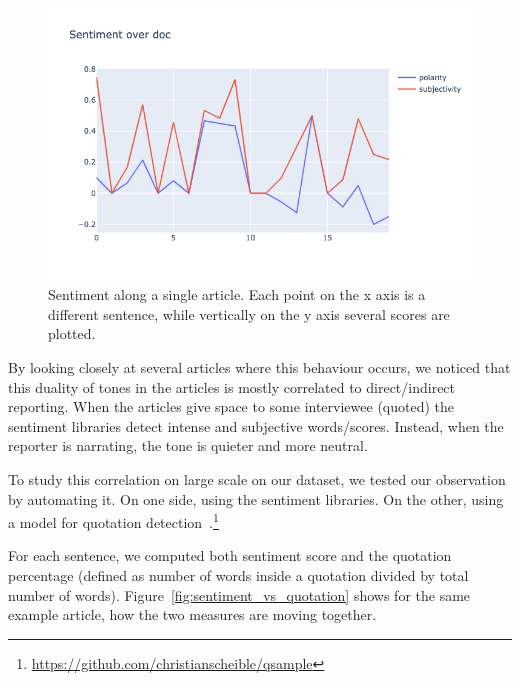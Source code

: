 \begin{figure}[!htbp]
    \centering
    \includegraphics[width=\linewidth]{figures/sentiment_across_article.png}
    \caption{Sentiment along a single article. Each point on the x axis is a different sentence, while vertically on the y axis several scores are plotted.}
    \label{fig:sentiment_across_one_article}
\end{figure}

By looking closely at several articles where this behaviour occurs, we noticed that this duality of tones in the articles is mostly correlated to direct/indirect reporting. When the articles give space to some interviewee (quoted) the sentiment libraries detect intense and subjective words/scores. Instead, when the reporter is narrating, the tone is quieter and more neutral.

To study this correlation on large scale on our dataset, we tested our observation by automating it.
On one side, using the sentiment libraries. On the other, using a model for quotation detection~\citep{scheible2016model}.\footnote{\url{https://github.com/christianscheible/qsample}}

For each sentence, we computed both sentiment score and the quotation percentage (defined as number of words inside a quotation divided by total number of words).
Figure~\ref{fig:sentiment_vs_quotation} shows for the same example article, how the two measures are moving together.

